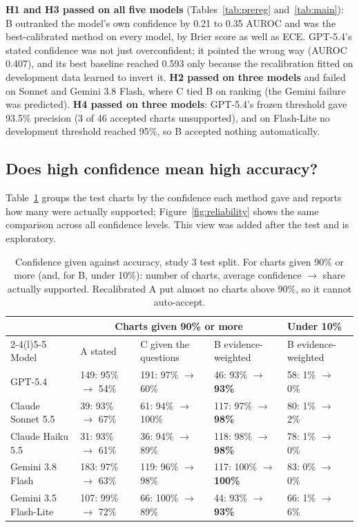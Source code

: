 \documentclass[10pt,letterpaper]{article}
\begin{document}
\textbf{H1 and H3 passed on all five models} (Tables~\ref{tab:prereg} and~\ref{tab:main}): B outranked the model's own confidence by 0.21 to 0.35 AUROC and was the best-calibrated method on every model, by Brier score as well as ECE. GPT-5.4's stated confidence was not just overconfident; it pointed the wrong way (AUROC 0.407), and its best baseline reached 0.593 only because the recalibration fitted on development data learned to invert it. \textbf{H2 passed on three models} and failed on Sonnet and Gemini 3.8 Flash, where C tied B on ranking (the Gemini failure was predicted). \textbf{H4 passed on three models}: GPT-5.4's frozen threshold gave 93.5\% precision (3 of 46 accepted charts unsupported), and on Flash-Lite no development threshold reached 95\%, so B accepted nothing automatically.

\subsection{Does high confidence mean high accuracy?}\label{sec:calib}

Table~\ref{tab:said} groups the test charts by the confidence each method gave and reports how many were actually supported; Figure~\ref{fig:reliability} shows the same comparison across all confidence levels. This view was added after the test and is exploratory.

\begin{table}[!htbp]
\centering\footnotesize\setlength{\tabcolsep}{4pt}
\caption{Confidence given against accuracy, study 3 test split. For charts given 90\% or more (and, for B, under 10\%): number of charts, average confidence $\rightarrow$ share actually supported. Recalibrated A put almost no charts above 90\%, so it cannot auto-accept.}\label{tab:said}
\begin{tabular}{@{}lllll@{}}
\toprule
 & \multicolumn{3}{c}{Charts given 90\% or more} & Under 10\% \\
\cmidrule(lr){2-4}\cmidrule(l){5-5}
Model & A stated & C given the questions & B evidence-weighted & B evidence-weighted \\
\midrule
GPT-5.4 & 149: 95\% $\rightarrow$ 54\% & 191: 97\% $\rightarrow$ 60\% & 46: 93\% $\rightarrow$ \textbf{93\%} & 58: 1\% $\rightarrow$ 0\% \\
Claude Sonnet 5.5 & 39: 93\% $\rightarrow$ 67\% & 61: 94\% $\rightarrow$ 100\% & 117: 97\% $\rightarrow$ \textbf{98\%} & 80: 1\% $\rightarrow$ 2\% \\
Claude Haiku 5.5 & 31: 93\% $\rightarrow$ 61\% & 36: 94\% $\rightarrow$ 89\% & 118: 98\% $\rightarrow$ \textbf{98\%} & 78: 1\% $\rightarrow$ 0\% \\
Gemini 3.8 Flash & 183: 97\% $\rightarrow$ 63\% & 119: 96\% $\rightarrow$ 98\% & 117: 100\% $\rightarrow$ \textbf{100\%} & 83: 0\% $\rightarrow$ 0\% \\
Gemini 3.5 Flash-Lite & 107: 99\% $\rightarrow$ 72\% & 66: 100\% $\rightarrow$ 89\% & 44: 93\% $\rightarrow$ \textbf{93\%} & 66: 1\% $\rightarrow$ 6\% \\
\bottomrule
\end{tabular}
\end{table}
\end{document}
